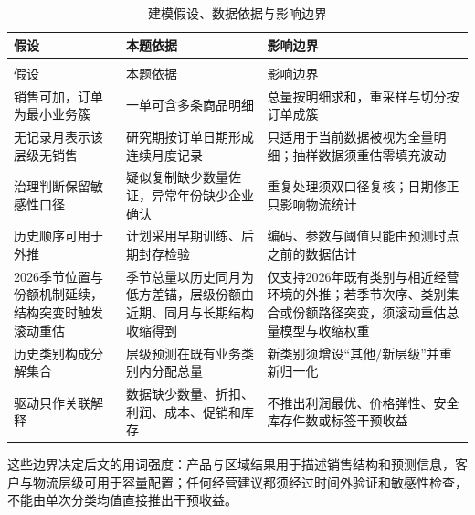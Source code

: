 \begingroup
\footnotesize
\setlength{\tabcolsep}{3pt}
\begin{longtable}{>{\centering\arraybackslash}p{}>{\centering\arraybackslash}p{}>{\centering\arraybackslash}p{}}
\caption{建模假设、数据依据与影响边界}\label{tab:model-assumption-boundary}\\
\toprule
假设 & 本题依据 & 影响边界 \\
\midrule
\endfirsthead
\multicolumn{3}{c}{续表~\thetable}\\
\toprule
假设 & 本题依据 & 影响边界 \\
\midrule
\endhead
\bottomrule
\endfoot
销售可加，订单为最小业务簇 & 一单可含多条商品明细 & 总量按明细求和，重采样与切分按订单成簇 \\ %
无记录月表示该层级无销售 & 研究期按订单日期形成连续月度记录 & 只适用于当前数据被视为全量明细；抽样数据须重估零填充波动 \\
治理判断保留敏感性口径 & 疑似复制缺少数量佐证，异常年份缺少企业确认 & 重复处理须双口径复核；日期修正只影响物流统计 \\ %
历史顺序可用于外推 & 计划采用早期训练、后期封存检验 & 编码、参数与阈值只能由预测时点之前的数据估计 \\ %
2026季节位置与份额机制延续，结构突变时触发滚动重估 & 季节总量以历史同月为低方差锚，层级份额由近期、同月与长期结构收缩得到 & 仅支持2026年既有类别与相近经营环境的外推；若季节次序、类别集合或份额路径突变，须滚动重估总量模型与收缩权重 \\ %
历史类别构成分解集合 & 层级预测在既有业务类别内分配总量 & 新类别须增设“其他/新层级”并重新归一化 \\
驱动只作关联解释 & 数据缺少数量、折扣、利润、成本、促销和库存 & 不推出利润最优、价格弹性、安全库存件数或标签干预收益 \\ %
\end{longtable}
\endgroup

这些边界决定后文的用词强度：产品与区域结果用于描述销售结构和预测信息，客户与物流层级可用于容量配置；任何经营建议都须经过时间外验证和敏感性检查，不能由单次分类均值直接推出干预收益。
